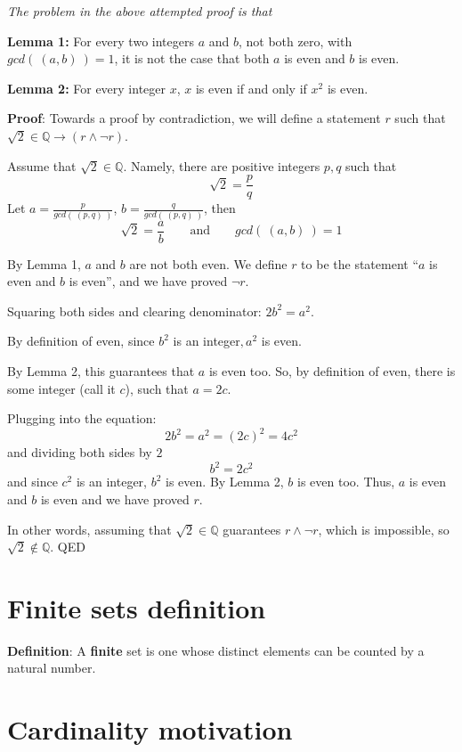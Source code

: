 \documentclass[12pt, oneside]{article}
\begin{document}
{\it The problem in the above attempted proof is that} \underline{\phantom{it only considers one candidate witness
and does not prove that no witnesses exist.}}


{\bf Lemma 1:} For every two integers $a$ and  $b$, not both zero, with  $gcd(~(a,b)~) = 1$, it is not the case that both $a$
is  even and $b$ is even.


{\bf Lemma 2:} For every integer  $x$, $x$ is  even if and only if $x^2$  is even.


{\bf Proof}: Towards a proof by contradiction, we will define a statement 
$r$ such that $\sqrt{2} \in \mathbb{Q} \to (r \land \lnot r)$. 

Assume that $\sqrt{2} \in \mathbb{Q}$. Namely, there are positive integers
$p, q$ such that 
\[
    \sqrt{2} = \frac{p}{q}
\]
Let $a= \frac{p}{gcd( ~(p,q)~)}$, $b = \frac{q}{gcd(~(p,q)~)}$, then 
\[
    \sqrt{2} = \frac{a}{b} \qquad \text{and} \qquad gcd(~(a,b)~) = 1
\]

By Lemma 1, $a$ and $b$ are not both even. We define $r$ to be the 
statement ``$a$ is even and $b$ is even'', and we have proved $\lnot r$.

Squaring both sides and clearing denominator: $2b^2 = a^2$.

By definition of even, since $b^2$ is an integer$, a^2$ is even.

By Lemma 2, this guarantees that $a$ is even too. So, by 
definition of even, there is some integer (call it $c$), such that $a = 2c$.

Plugging into the equation:
\[
    2b^2 = a^2 = (2c)^2 = 4c^2
\]
and dividing both sides by $2$
\[
    b^2 = 2c^2
\]
and since $c^2$ is an integer, $b^2$ is even. By Lemma 2, $b$ is even too.
Thus, $a$ is even and $b$ is even and we have proved $r$. 

In other words, assuming that $\sqrt{2} \in \mathbb{Q}$ guarantees $r \land \lnot r$, 
which is impossible, so $\sqrt{2} \notin \mathbb{Q}$. QED

 \vfill
\section*{Finite sets definition}


{\bf Definition}: A {\bf finite} set is one whose distinct elements can be counted by a natural number.
 \vfill
\section*{Cardinality motivation}
\end{document}
